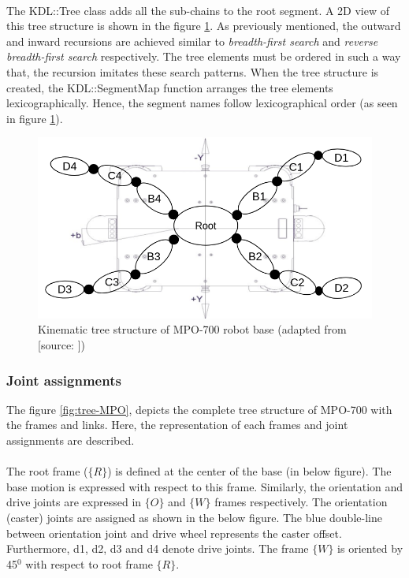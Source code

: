 \paragraph{}The KDL::Tree class adds all the sub-chains to the root segment. A 2D view of this tree structure is shown in the figure \ref{fig:planar-tree}. As previously mentioned, the outward and inward recursions are achieved similar to \textit{breadth-first search} and \textit{reverse breadth-first search} respectively. The tree elements must be ordered in such a way that, the recursion imitates these search patterns. When the tree structure is created, the KDL::SegmentMap function arranges the tree elements lexicographically. Hence, the segment names follow lexicographical order (as seen in figure \ref{fig:planar-tree}).  

\begin{figure}[h!]
	\begin{center}
		\includegraphics[scale=0.45]{images/kinematic-tree-MPO-700}
	\end{center}	
	\caption{Kinematic tree structure of MPO-700 robot base (adapted from [source: \cite{MPO700}])}
	\label{fig:planar-tree}
\end{figure}

\subsubsection*{Joint assignments}
The figure \ref{fig:tree-MPO}, depicts the complete tree structure of MPO-700 with the frames and links. Here, the representation of each frames and joint assignments are described. 
\paragraph{}The root frame ($\{R\}$) is defined at the center of the base (in below figure). The base motion is expressed with respect to this frame. Similarly, the orientation and drive joints are expressed in $\{O\}$ and $\{W\}$ frames respectively. The orientation (caster) joints are assigned as shown in the below figure. The blue double-line between orientation joint and drive wheel represents the caster offset. Furthermore, d1, d2, d3 and d4 denote drive joints. The frame $\{W\}$ is oriented by 45$^0$ with respect to root frame $\{R\}$. 

